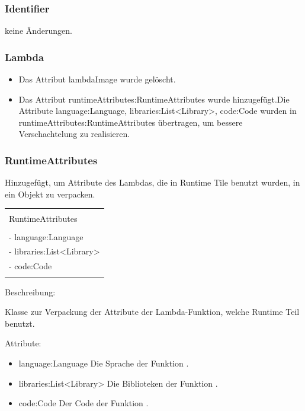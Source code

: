 \documentclass[a4paper,20pt,oneside]{book}
\begin{document}
	\subsubsection{Identifier}
	keine Änderungen.	
	\subsubsection{Lambda}
	\begin{itemize}
	\item Das Attribut lambdaImage wurde gelöscht.\linebreak
	\item Das Attribut runtimeAttributes:RuntimeAttributes wurde hinzugefügt.Die Attribute language:Language, libraries:List<Library>, code:Code wurden in runtimeAttributes:RuntimeAttributes übertragen, um bessere Verschachtelung zu realisieren.\linebreak
	 \end{itemize}
	 \subsubsection{RuntimeAttributes}
	
	Hinzugefügt, um Attribute des Lambdas, die in Runtime Tile benutzt wurden, in ein Objekt zu verpacken.	
	
		\centering
	\begin{tabular}{|l|}
	\hline \\
	RuntimeAttributes\\
	\hline \\	
    - language:Language\\
    - libraries:List<Library>\\
    - code:Code\\
    \hline \\
	\hline 
	\end{tabular}
	
	\raggedright
	\vspace{0.5cm}
	Beschreibung:
	
	Klasse zur Verpackung der Attribute der Lambda-Funktion, welche Runtime Teil benutzt.
	
	\vspace{0.5cm}
	Attribute:
	\begin{itemize}
    \item language:Language \linebreak
    Die Sprache der Funktion .
     \item libraries:List<Library> \linebreak
    Die Biblioteken der Funktion .
     \item code:Code \linebreak
    Der Code der Funktion .
	\end{itemize}
	
\end{document}

